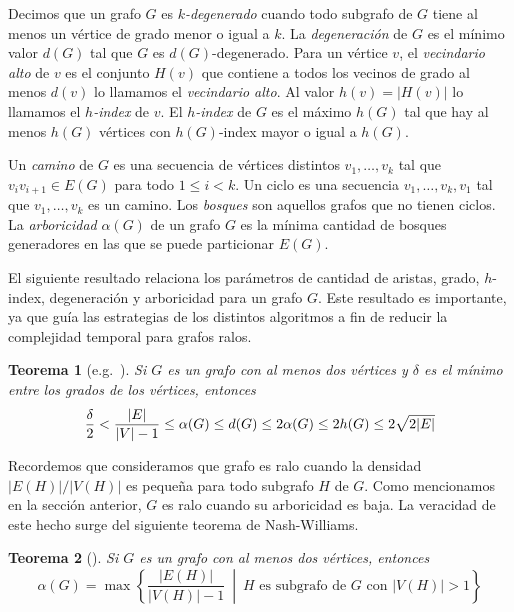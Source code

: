 \documentclass[%
    a4paper,%
    fontsize=12pt,%
    DIV=12,
    twoside,%
    openright,%
    titlepage=true,%
    headsepline,%
    toc=bibliography,%
    parskip=half,%
    cleardoublepage=empty,%
    headings=big,%
]{scrbook}
\newtheorem{theorem}{Teorema}
\begin{document}
Decimos que un grafo $G$ es \emph{$k$-degenerado} cuando todo subgrafo de $G$ tiene al menos un vértice de grado menor o igual a $k$.  La \emph{degeneración} de $G$ es el mínimo valor $d(G)$ tal que $G$ es $d(G)$-degenerado.  Para un vértice $v$, el \emph{vecindario alto} de $v$ es el conjunto $H(v)$ que contiene a todos los vecinos de grado al menos $d(v)$ lo llamamos el \emph{vecindario alto}.  Al valor $h(v) = |H(v)|$ lo llamamos el \emph{$h$-index} de $v$.  El \emph{$h$-index} de $G$ es el máximo $h(G)$ tal que hay al menos $h(G)$ vértices con $h(G)$-index mayor o igual a $h(G)$.

Un \emph{camino} de $G$ es una secuencia de vértices distintos $v_1, \ldots, v_k$ tal que $v_iv_{i+1} \in E(G)$ para todo $1 \leq i < k$.  Un ciclo es una secuencia $v_1, \ldots, v_k, v_1$ tal que $v_1, \ldots, v_k$ es un camino.  Los \emph{bosques} son aquellos grafos que no tienen ciclos.  La \emph{arboricidad} $\alpha(G)$ de un grafo $G$ es la mínima cantidad de bosques generadores en las que se puede particionar $E(G)$.  

El siguiente resultado relaciona los parámetros de cantidad de aristas, grado, $h$-index, degeneración y arboricidad para un grafo $G$.  Este resultado es importante, ya que guía las estrategias de los distintos algoritmos a fin de reducir la complejidad temporal para grafos ralos.

\begin{theorem}[e.g.~\cite{ChibaNishizekiSJC1985,LinSoulignacSzwarcfiterTCS2012}]
 Si $G$ es un grafo con al menos dos vértices y $\delta$ es el mínimo entre los grados de los vértices, entonces
 \begin{displaymath}
   \frac{\delta}{2} < \frac{|E|}{|V|-1} \leq \alpha(G) \leq d(G) \leq 2\alpha(G) \leq 2h(G) \leq 2\sqrt{2|E|} \\
 \end{displaymath}
\end{theorem}

Recordemos que consideramos que grafo es ralo cuando la densidad $|E(H)|/|V(H)|$ es pequeña para todo subgrafo $H$ de $G$.  Como mencionamos en la sección anterior, $G$ es ralo cuando su arboricidad es baja.  La veracidad de este hecho surge del siguiente teorema de Nash-Williams.

\begin{theorem}[\cite{Nash-WilliamsJLMS1964}]
  Si $G$ es un grafo con al menos dos vértices, entonces
  \[\alpha(G) = \max\left\{\frac{|E(H)|}{|V(H)|-1} \ \middle| \ H \text{ es subgrafo de }G \text{ con } |V(H)| > 1\right\}\]
\end{theorem}
\end{document}
